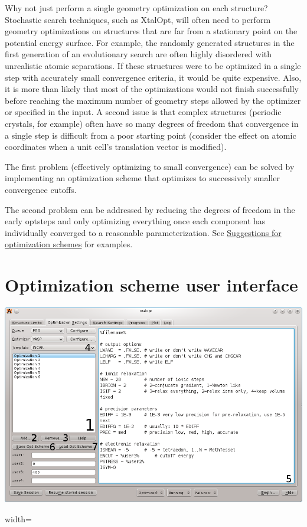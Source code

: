 Why not just perform a single geometry optimization on each structure? Stochastic search techniques, such as Xtal\-Opt, will often need to perform geometry optimizations on structures that are far from a stationary point on the potential energy surface. For example, the randomly generated structures in the first generation of an evolutionary search are often highly disordered with unrealistic atomic separations. If these structures were to be optimized in a single step with accurately small convergence criteria, it would be quite expensive. Also, it is more than likely that most of the optimizations would not finish successfully before reaching the maximum number of geometry steps allowed by the optimizer or specified in the input. A second issue is that complex structures (periodic crystals, for example) often have so many degrees of freedom that convergence in a single step is difficult from a poor starting point (consider the effect on atomic coordinates when a unit cell's translation vector is modified).

The first problem (effectively optimizing to small convergence) can be solved by implementing an optimization scheme that optimizes to successively smaller convergence cutoffs.

The second problem can be addressed by reducing the degrees of freedom in the early optsteps and only optimizing everything once each component has individually converged to a reasonable parameterization. See \hyperlink{optschemes_suggest}{Suggestions for optimization schemes} for examples.\hypertarget{optschemes_gui}{}\section{Optimization scheme user interface}\label{optschemes_gui}
 
\begin{DoxyImage}
\includegraphics{optschemes-numberededitor.png}
\caption{width=}
\end{DoxyImage}


